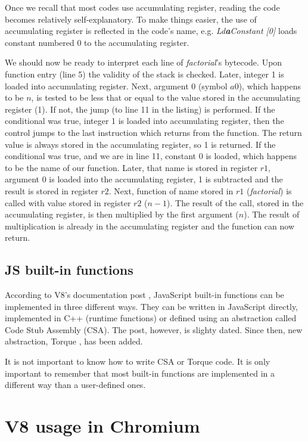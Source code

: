 Once we recall that most codes use accumulating register, reading the code becomes relatively self-explanatory.
To make things easier, the use of accumulating register is reflected in the code's name, e.g. 
\emph{Ld\textbf{a}Constant [0]} loads constant numbered 0 to the accumulating register.

We should now be ready to interpret each line of \emph{factorial}'s bytecode.
Upon function entry (line 5) the validity of the stack is checked. Later, integer 1 is loaded into
accumulating register. Next, argument 0 (symbol $a0$), which happens to be $n$, is tested 
to be less that or equal to the value stored in the accumulating register (1).
If not, the jump (to line 11 in the listing) is performed. If the conditional was true, integer 1 is loaded
into accumulating register, then the control jumps to the last instruction which returns from the function.
The return value is always stored in the accumulating register, so 1 is returned.
If the conditional was true, and we are in line 11, constant 0 is loaded, which happens to be the name of our function.
Later, that name is stored in register $r1$, argument 0 is loaded into the accumulating register, 1 is subtracted and the result
is stored in register $r2$. Next, function of name stored in $r1$ (\emph{factorial}) is called with value stored in 
register $r2$ ($n-1$). The result of the call, stored in the accumulating register, is then multiplied by the first argument
($n$). The result of multiplication is already in the accumulating register and the function can now return.


\subsection{JS built-in functions}
\label{v8-builtins}

According to V8's documentation post \cite{v8:built-ins}, JavaScript built-in functions can be implemented
in three different ways. They can be written in JavaScript directly, implemented in C++ (runtime functions)
or defined using an abstraction called Code Stub Assembly (CSA). The post, however, is slighty dated. Since then,
new abstraction, Torque \cite{v8:torque}, has been added.

It is not important to know how to write CSA or Torque code. It is only important to remember 
that most built-in functions are implemented in a different way than a user-defined ones.


\section{V8 usage in Chromium}
\label{v8-in-chrome}

